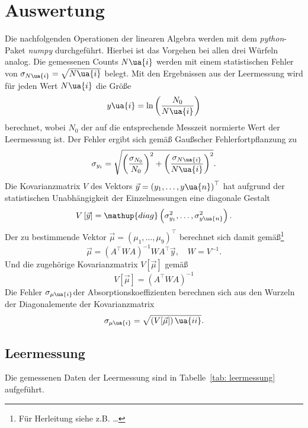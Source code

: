 \section{Auswertung}
Die nachfolgenden Operationen der linearen Algebra werden mit dem \emph{python}-Paket
\emph{numpy}\cite{} durchgeführt. Hierbei ist das Vorgehen bei allen drei Würfeln
analog. Die gemessenen Counts $N\ua{i}$ werden mit einem statistischen Fehler
von $\sigma_{N\ua{i}} = \sqrt{N\ua{i}}$ belegt. Mit den Ergebnissen aus
der Leermessung wird für jeden Wert $N\ua{i}$ die Größe
\begin{equation}
  y\ua{i} = \ln\left(\frac{N_0}{N\ua{i}} \right)
\end{equation}
berechnet, wobei $N_0$ der auf die entsprechende Messzeit normierte Wert der Leermessung ist.
Der Fehler ergibt sich gemäß Gaußscher Fehlerfortpflanzung zu
\begin{equation}
  \sigma_{y_i} = \sqrt{\left(\frac{\sigma_{N_0}}{N_0} \right)^2 +    \left(\frac{\sigma_{N\ua{i}}}{N\ua{i}} \right)^2}.
\end{equation}
Die Kovarianzmatrix $V$ des Vektors $\vec{y} = \left(y_1, \dots , y\ua{n} \right)^\top$ hat aufgrund der statistischen Unabhängigkeit der
Einzelmessungen eine diagonale Gestalt
\begin{equation}
  V\left[\vec{y}\right] = \mathup{diag}\left(\sigma_{y_1}^2, \dots , \sigma_{y\ua{n}}^2 \right).
\end{equation}
Der zu bestimmende Vektor $\vec{\mu} = \left(\mu_1, \dots , \mu_9 \right)^\top$ berechnet sich damit gemäß\footnote{Für Herleitung siehe z.B. \dots}
\begin{equation}
  \vec{\mu} = \left(A^\top W A\right)^{-1} W A^\top \vec{y}, \quad W = V^{-1}.
\end{equation}
Und die zugehörige Kovarianzmatrix $V[\vec{\mu}]$ gemäß
\begin{equation}
  V[\vec{\mu}] = \left( A^\top W  A\right)^{-1}
\end{equation}
Die Fehler $\sigma_{\mu\ua{i}}$der Absorptionskoeffizienten berechnen sich aus den Wurzeln der Diagonalemente der Kovarianzmatrix
\begin{equation}
 \sigma_{\mu\ua{i}} = \sqrt{\left(V[\vec{\mu}]\right)\ua{ii}}.
\end{equation}





\subsection{Leermessung}
Die gemessenen Daten der Leermessung sind in Tabelle~\ref{tab: leermessung} aufgeführt.
%


